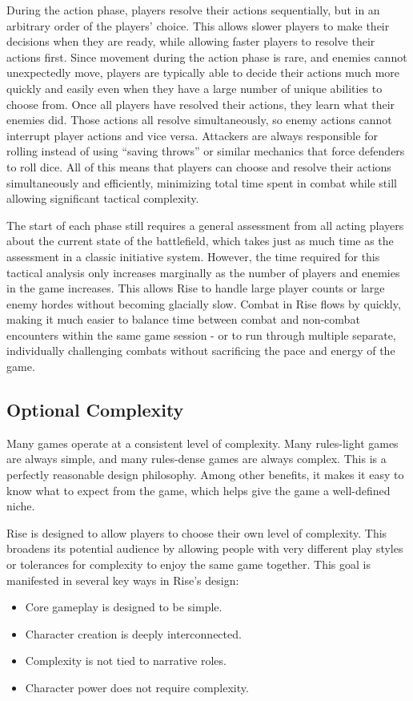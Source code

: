     During the action phase, players resolve their actions sequentially, but in an arbitrary order of the players' choice.
    This allows slower players to make their decisions when they are ready, while allowing faster players to resolve their actions first.
    Since movement during the action phase is rare, and enemies cannot unexpectedly move, players are typically able to decide their actions much more quickly and easily even when they have a large number of unique abilities to choose from.
    Once all players have resolved their actions, they learn what their enemies did.
    Those actions all resolve simultaneously, so enemy actions cannot interrupt player actions and vice versa.
    Attackers are always responsible for rolling instead of using ``saving throws'' or similar mechanics that force defenders to roll dice.
    All of this means that players can choose and resolve their actions simultaneously and efficiently, minimizing total time spent in combat while still allowing significant tactical complexity.

    The start of each phase still requires a general assessment from all acting players about the current state of the battlefield, which takes just as much time as the assessment in a classic initiative system.
    However, the time required for this tactical analysis only increases marginally as the number of players and enemies in the game increases.
    This allows Rise to handle large player counts or large enemy hordes without becoming glacially slow.
    Combat in Rise flows by quickly, making it much easier to balance time between combat and non-combat encounters within the same game session - or to run through multiple separate, individually challenging combats without sacrificing the pace and energy of the game.

  \subsection{Optional Complexity}
    Many games operate at a consistent level of complexity.
    Many rules-light games are always simple, and many rules-dense games are always complex.
    This is a perfectly reasonable design philosophy.
    Among other benefits, it makes it easy to know what to expect from the game, which helps give the game a well-defined niche.

    Rise is designed to allow players to choose their own level of complexity.
    This broadens its potential audience by allowing people with very different play styles or tolerances for complexity to enjoy the same game together.
    This goal is manifested in several key ways in Rise's design:
    \begin{itemize}
      \item Core gameplay is designed to be simple.
      \item Character creation is deeply interconnected.
      \item Complexity is not tied to narrative roles.
      \item Character power does not require complexity.
    \end{itemize}

